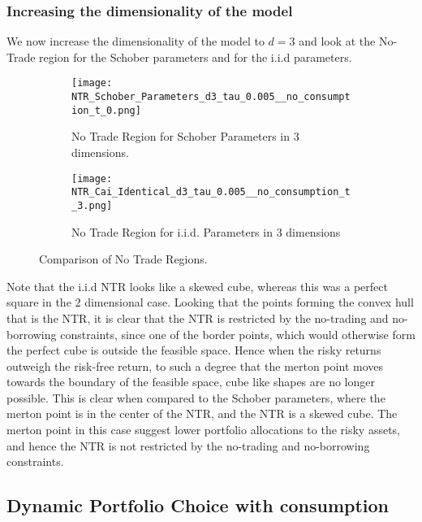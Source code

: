 \documentclass[11pt]{article}
\begin{document}
\subsubsection{Increasing the dimensionality of the model} \label{Subsubsection: IncreasingDimensionality}
We now increase the dimensionality of the model to $d = 3$ and look at the No-Trade region for the Schober parameters and for the i.i.d parameters.

\begin{figure}[!ht]
    \centering
    \begin{subfigure}[t]{0.48\textwidth}
        \centering
        \texttt{[image: NTR\_Schober\_Parameters\_d3\_tau\_0.005\_\_no\_consumption\_t\_0.png]}
        \caption{No Trade Region for Schober Parameters in 3 dimensions.}
        \label{fig:NTR_3d_Schober}
    \end{subfigure}%
    \hfill
    \begin{subfigure}[t]{0.48\textwidth}
        \centering
        \texttt{[image: NTR\_Cai\_Identical\_d3\_tau\_0.005\_\_no\_consumption\_t\_3.png]}
        \caption{No Trade Region for i.i.d. Parameters in 3 dimensions}
        \label{fig:NTR_3d_iid_Correlation}
    \end{subfigure}

    \caption{Comparison of No Trade Regions.}
    \label{fig:comparison_NTR_3d}
\end{figure}
Note that the i.i.d NTR looks like a skewed cube, whereas this was a perfect square in the 2 dimensional case.
Looking that the points forming the convex hull that is the NTR, it is clear that the NTR is restricted by the no-trading and no-borrowing constraints,
since one of the border points, which would otherwise form the perfect cube is outside the feasible space. Hence when the risky returns outweigh the risk-free return,
to such a degree that the merton point moves towards the boundary of the feasible space, cube like shapes are no longer possible.
This is clear when compared to the Schober parameters, where the merton point is in the center of the NTR, and the NTR is a skewed cube.
The merton point in this case suggest lower portfolio allocations to the risky assets, and hence the NTR is not restricted by the no-trading and no-borrowing constraints.

\subsection{Dynamic Portfolio Choice with consumption} \label{Subsection: Results_WithConsumption}
\end{document}
